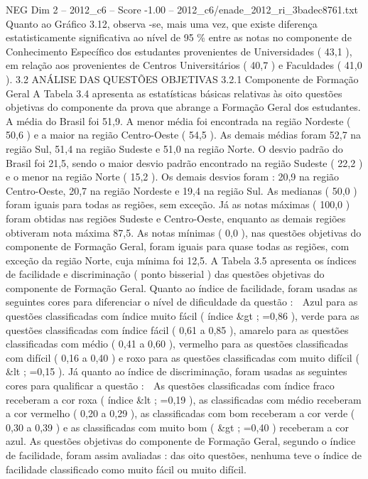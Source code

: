 \begin{textsample}{NEG Dim 2 – 2012\_c6 – Score -1.00 – 2012\_c6/enade\_2012\_ri\_3badec8761.txt}
Quanto ao Gráfico 3.12, observa -se, mais uma vez, que existe diferença estatisticamente significativa ao nível de 95 \% entre as notas no componente de Conhecimento Específico dos estudantes provenientes de Universidades ( 43,1 ), em relação aos provenientes de Centros Universitários ( 40,7 ) e Faculdades ( 41,0 ). 3.2 ANÁLISE DAS QUESTÕES OBJETIVAS 3.2.1 Componente de Formação Geral A Tabela 3.4 apresenta as estatísticas básicas relativas às oito questões objetivas do componente da prova que abrange a Formação Geral dos estudantes.
A média do Brasil foi 51,9.
A menor média foi encontrada na região Nordeste ( 50,6 ) e a maior na região Centro-Oeste ( 54,5 ).
As demais médias foram 52,7 na região Sul, 51,4 na região Sudeste e 51,0 na região Norte.
O desvio padrão do Brasil foi 21,5, sendo o maior desvio padrão encontrado na região Sudeste ( 22,2 ) e o menor na região Norte ( 15,2 ).
Os demais desvios foram : 20,9 na região Centro-Oeste, 20,7 na região Nordeste e 19,4 na região Sul.
As medianas ( 50,0 ) foram iguais para todas as regiões, sem exceção.
Já as notas máximas ( 100,0 ) foram obtidas nas regiões Sudeste e Centro-Oeste, enquanto as demais regiões obtiveram nota máxima 87,5.
As notas mínimas ( 0,0 ), nas questões objetivas do componente de Formação Geral, foram iguais para quase todas as regiões, com exceção da região Norte, cuja mínima foi 12,5.
A Tabela 3.5 apresenta os índices de facilidade e discriminação ( ponto bisserial ) das questões objetivas do componente de Formação Geral.
Quanto ao índice de facilidade, foram usadas as seguintes cores para diferenciar o nível de dificuldade da questão :  Azul para as questões classificadas com índice muito fácil ( índice \&gt ; =0,86 ), verde para as questões classificadas com índice fácil ( 0,61 a 0,85 ), amarelo para as questões classificadas com médio ( 0,41 a 0,60 ), vermelho para as questões classificadas com difícil ( 0,16 a 0,40 ) e roxo para as questões classificadas com muito difícil ( \&lt ; =0,15 ).
Já quanto ao índice de discriminação, foram usadas as seguintes cores para qualificar a questão :  As questões classificadas com índice fraco receberam a cor roxa ( índice \&lt ; =0,19 ), as classificadas com médio receberam a cor vermelho ( 0,20 a 0,29 ), as classificadas com bom receberam a cor verde ( 0,30 a 0,39 ) e as classificadas com muito bom ( \&gt ; =0,40 ) receberam a cor azul.
As questões objetivas do componente de Formação Geral, segundo o índice de facilidade, foram assim avaliadas : das oito questões, nenhuma teve o índice de facilidade classificado como muito fácil ou muito difícil.

\end{textsample}
